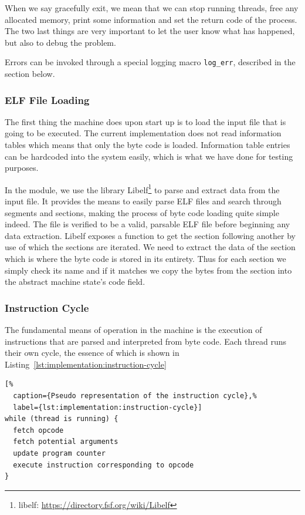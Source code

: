 When we say gracefully exit, we mean that we can stop running threads, free any
allocated memory, print some information and set the return code of the
process. The two last things are very important to let the user know what has
happened, but also to debug the problem.

Errors can be invoked through a special logging macro {\tt log\_err}, described
in the  section
below.

\subsubsection{ELF File Loading}

The first thing the machine does upon start up is to load the input file that is
going to be executed. The current implementation does not read information
tables which means that only the byte code is loaded. Information table entries
can be hardcoded into the system easily, which is what we have done for testing
purposes.

In the  module, we use the library Libelf\footnote{libelf:
  \url{https://directory.fsf.org/wiki/Libelf}} to parse and extract data from
the input file. It provides the means to easily parse ELF files and search
through segments and sections, making the process of byte code loading quite
simple indeed. The file is verified to be a valid, parsable ELF file before
beginning any data extraction. Libelf exposes a function to get the section
following another by use of which the sections are iterated. We need to extract
the data of the  section which is where the byte code is stored in
its entirety. Thus for each section we simply check its name and if it matches
we copy the bytes from the section into the abstract machine state's code field.

\subsubsection{Instruction Cycle}

The fundamental means of operation in the machine is the execution of
instructions that are parsed and interpreted from byte code. Each thread runs
their own cycle, the essence of which is shown in
Listing~\ref{lst:implementation:instruction-cycle}

\begin{lstlisting}[%
  caption={Pseudo representation of the instruction cycle},%
  label={lst:implementation:instruction-cycle}]
while (thread is running) {
  fetch opcode
  fetch potential arguments
  update program counter
  execute instruction corresponding to opcode
}
\end{lstlisting}

